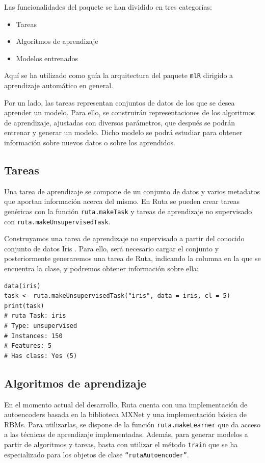 Las funcionalidades del paquete se han dividido en tres categorías:
\begin{itemize}
\item Tareas
\item Algoritmos de aprendizaje
\item Modelos entrenados
\end{itemize}
Aquí se ha utilizado como guía la arquitectura del paquete \texttt{mlR} \autocite{mlr} dirigido a aprendizaje automático en general.

Por un lado, las tareas representan conjuntos de datos de los que se desea aprender un modelo. Para ello, se construirán representaciones de los algoritmos de aprendizaje, ajustadas con diversos parámetros, que después se podrán entrenar y generar un modelo. Dicho modelo se podrá estudiar para obtener información sobre nuevos datos o sobre los aprendidos.

\subsection{Tareas}

Una tarea de aprendizaje se compone de un conjunto de datos y varios metadatos que aportan información acerca del mismo. En Ruta se pueden crear tareas genéricas con la función \texttt{ruta.makeTask} y tareas de aprendizaje no supervisado con \texttt{ruta.makeUnsupervisedTask}.

\begin{example}
  Construyamos una tarea de aprendizaje no supervisado a partir del conocido conjunto de datos Iris \autocite{fisher1936iris}. Para ello, será necesario cargar el conjunto y posteriormente generaremos una tarea de Ruta, indicando la columna en la que se encuentra la clase, y podremos obtener información sobre ella:
  \begin{lstlisting}
data(iris)
task <- ruta.makeUnsupervisedTask("iris", data = iris, cl = 5)
print(task)
# ruta Task: iris
# Type: unsupervised
# Instances: 150
# Features: 5
# Has class: Yes (5)
  \end{lstlisting}
\end{example}

\subsection{Algoritmos de aprendizaje}

En el momento actual del desarrollo, Ruta cuenta con una implementación de autoencoders basada en la biblioteca MXNet y una implementación básica de RBMs. Para utilizarlas, se dispone de la función \texttt{ruta.makeLearner} que da acceso a las técnicas de aprendizaje implementadas. Además, para generar modelos a partir de algoritmos y tareas, basta con utilizar el método \texttt{train} que se ha especializado para los objetos de clase \texttt{``rutaAutoencoder''}.

